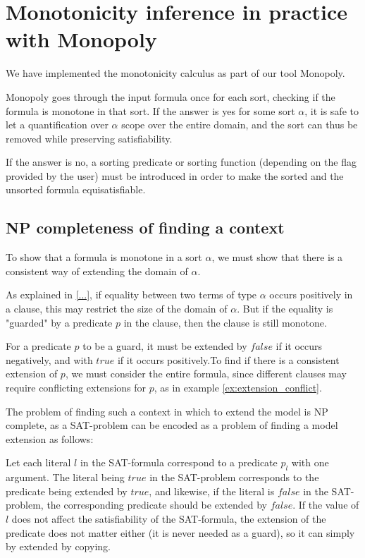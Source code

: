 \section{Monotonicity inference in practice with Monopoly}

We have implemented the monotonicity calculus as part of our tool
Monopoly. 

Monopoly goes through the input formula once for each sort, checking if
the formula is monotone in that sort. If the answer is yes for some sort $\alpha$,
it is safe to let a quantification over $\alpha$ scope over the entire domain,
and the sort can thus be removed while preserving satisfiability. 

If the answer is no, a sorting predicate or sorting function (depending on the
flag provided by the user) must be introduced in order to make the sorted and the 
unsorted formula equisatisfiable.
 
\subsection{NP completeness of finding a context}

  To show that a formula is monotone in a sort $\alpha$, we must show that there is
  a consistent way of extending the domain of $\alpha$. 

  As explained in \ref{...}, if equality between two terms of type $\alpha$ occurs 
  positively in a clause, this may restrict the size of the domain of $\alpha$. But if 
  the equality is "guarded" by a predicate $p$ in the clause, then the clause is still monotone.

  For a predicate $p$ to be a guard, it must be extended by $false$ if it occurs negatively,
  and with $true$ if it occurs positively.To find if there is a consistent extension of $p$, 
  we must consider the entire formula, since different clauses may require conflicting 
  extensions for $p$, as in example \ref{ex:extension_conflict}.

  The problem of finding such a context in which to extend the model is NP complete, as a SAT-problem can be 
  encoded as a problem of finding a model extension as follows:

  Let each literal $l$ in the SAT-formula correspond to a predicate $p_l$ with one argument.
  The literal being $true$ in the SAT-problem corresponds to the predicate
  being extended by $true$, and likewise, if the literal is $false$ in the SAT-
  problem, the corresponding predicate should be extended by $false$. If the value of $l$ does
  not affect the satisfiability of the SAT-formula, the extension of the predicate does not
  matter either (it is never needed as a guard), so it can simply by extended by copying. 

